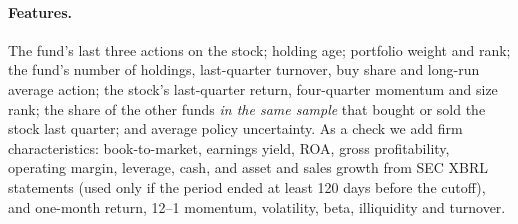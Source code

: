 \paragraph{Features.} The fund's last three actions on the stock; holding age;
portfolio weight and rank; the fund's number of holdings, last-quarter
turnover, buy share and long-run average action; the stock's last-quarter
return, four-quarter momentum and size rank; the share of the other funds
\emph{in the same sample} that bought or sold the stock last quarter; and
average policy uncertainty. As a check we add \firmn{} firm characteristics:
book-to-market, earnings yield, ROA, gross profitability, operating margin,
leverage, cash, and asset and sales growth from SEC XBRL statements (used only
if the period ended at least 120 days before the cutoff), and one-month
return, 12--1 momentum, volatility, beta, illiquidity and turnover.

